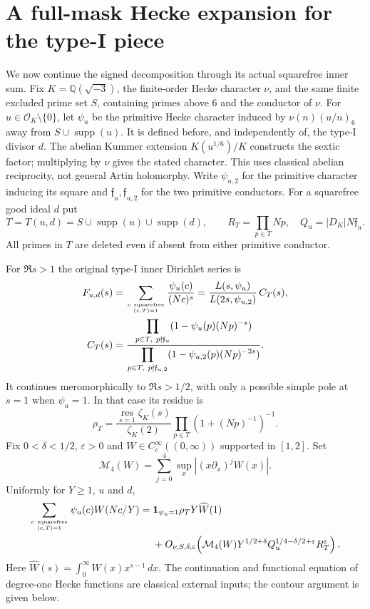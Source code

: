 \section{A full-mask Hecke expansion for the type-I piece}
\label{hti:core}
We now continue the signed decomposition through its actual squarefree
inner sum. Fix $K=\mathbb Q(\sqrt{-3})$, the finite-order Hecke character
$\nu$, and the same finite excluded prime set $S$, containing primes above
$6$ and the conductor of $\nu$. For $u\in\mathcal O_K\setminus\{0\}$,
let $\psi_u$ be the primitive Hecke character induced by
$\nu(n)(u/n)_6$ away from $S\cup\operatorname{supp}(u)$.
It is defined before, and independently of, the type-I divisor $d$.
The abelian Kummer extension $K(u^{1/6})/K$ constructs the sextic
factor; multiplying by $\nu$ gives the stated character.
This uses classical abelian reciprocity, not general Artin holomorphy.
Write $\psi_{u,2}$ for the primitive character inducing its square and
$\mathfrak f_u,\mathfrak f_{u,2}$ for the two primitive conductors.
For a squarefree good ideal $d$ put
\[
 T=T(u,d)=S\cup\operatorname{supp}(u)\cup\operatorname{supp}(d),\qquad
 R_T=\prod_{p\in T}Np,\quad Q_u=|D_K|N\mathfrak f_u.
\]
All primes in $T$ are deleted even if absent from either primitive conductor.

\begin{theorem}
\label{hti:theorem}
For $\Re s>1$ the original type-I inner Dirichlet series is
\begin{align}
 F_{u,d}(s)
 &=\sum_{c\ {\rm squarefree}\atop(c,T)=1}
       \frac{\psi_u(c)}{(Nc)^s}
   =\frac{L(s,\psi_u)}{L(2s,\psi_{u,2})}\,C_T(s),\label{hti:ratio}\\
 C_T(s)
 &=\frac{\displaystyle\prod_{p\in T,\ p\nmid\mathfrak f_u}
             (1-\psi_u(p)(Np)^{-s})}
          {\displaystyle\prod_{p\in T,\ p\nmid\mathfrak f_{u,2}}
             (1-\psi_{u,2}(p)(Np)^{-2s})}.
 \label{hti:restore}
\end{align}
It continues meromorphically to $\Re s>1/2$, with only a possible
simple pole at $s=1$ when $\psi_u=1$. In that case its residue is
\[
 \rho_T=\frac{\operatorname*{res}_{s=1}\zeta_K(s)}{\zeta_K(2)}
             \prod_{p\in T}(1+(Np)^{-1})^{-1}.
\]
Fix $0<\delta<1/2$, $\varepsilon>0$ and
$W\in C_c^\infty((0,\infty))$ supported in $[1,2]$. Set
\[\mathcal M_4(W)=\sum_{j=0}^4\sup_x|(x\partial_x)^jW(x)|.\]
Uniformly for $Y\ge1$, $u$ and $d$,
\begin{align}
 \sum_{c\ {\rm squarefree}\atop(c,T)=1}\psi_u(c)W(Nc/Y)
 ={}&\mathbf1_{\psi_u=1}\rho_TY\widehat W(1)\notag\\
 &+O_{\nu,S,\delta,\varepsilon}\!\left(
 \mathcal M_4(W)Y^{1/2+\delta}
 Q_u^{1/4-\delta/2+\varepsilon}R_T^\varepsilon\right).
 \label{hti:scalar}
\end{align}
Here $\widehat W(s)=\int_0^\infty W(x)x^{s-1}\,dx$.
The continuation and functional equation of degree-one Hecke functions
are classical external inputs; the contour argument is given below.
\end{theorem}

